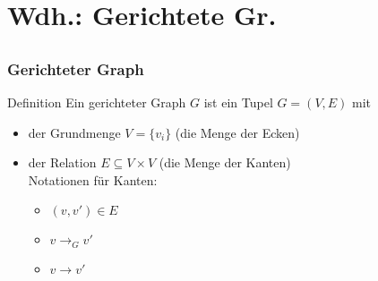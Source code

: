 
\section{Wdh.: Gerichtete Gr.}
\subsection*{}
\begin{frame}
	\frametitle{Gerichteter Graph}
	\begin{block}{Definition}
	Ein gerichteter Graph $G$ ist ein Tupel $G=(V,E)$ mit
	\begin{itemize}
		\item der Grundmenge $V = \{v_i\}$ (die Menge der Ecken)
		\item der Relation $E\subseteq V\times V$ (die Menge der Kanten) \\ Notationen für Kanten:
		\begin{itemize}
			\item $(v,v')\in E$
			\item $v\rightarrow_G v'$
			\item $v \to v'$
		\end{itemize}
	\end{itemize}
	\end{block}
\end{frame}

